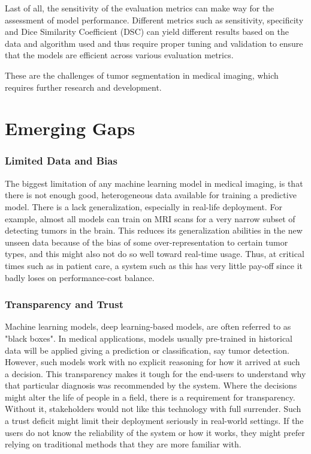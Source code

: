 \documentclass[conference]{IEEEtran}
\begin{document}
Last of all, the sensitivity  of the evaluation metrics can make way for the assessment of model performance. Different metrics such as sensitivity,  specificity and Dice Similarity Coefficient (DSC) can yield different results based on the data and  algorithm used and thus require proper tuning and validation to ensure that the models are efficient across various evaluation metrics.

These are the challenges of tumor segmentation in medical imaging, which requires further research and development.

\section{Emerging Gaps}
\subsubsection{Limited Data and Bias} The biggest limitation of any machine learning model in medical imaging, is that there is not enough good, heterogeneous data available for training a predictive model. There is a lack generalization, especially in real-life deployment. For example, almost all models can train on MRI scans for a very narrow subset of detecting tumors in the brain. This reduces its generalization abilities in the new unseen data because of the bias of some over-representation to certain tumor types, and this might also not do so well toward real-time usage. Thus, at critical times such as in patient care, a system such as this has very little pay-off since it badly loses on performance-cost balance.

\subsubsection{Transparency and Trust} Machine learning models, deep learning-based models, are often referred to as "black boxes". In medical applications, models usually pre-trained in historical data will be applied giving a prediction or classification, say tumor detection. However, such models work with no explicit reasoning for how it arrived at such a decision. This transparency makes it tough for the end-users to understand why that particular diagnosis was recommended by the system. Where the decisions might alter the life of people in a field, there is a requirement for transparency. Without it, stakeholders would not like this technology with full surrender. Such a trust deficit might limit their deployment seriously in real-world settings. If the users do not know the reliability of the system or how it works, they might prefer relying on traditional methods that they are more familiar with.
\end{document}
